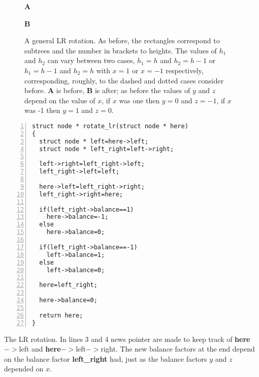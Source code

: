 \documentclass[11pt,a4paper]{scrartcl}
\begin{document}
\begin{figure}
{\bf A}
\begin{center}
\end{center}
{\bf B}
\begin{center}
\end{center}
\caption{A general LR rotation. As before, the rectangles correspond
  to subtrees and the number in brackets to heights. The values of
  $h_1$ and $h_2$ can vary between two cases, $h_1=h$ and $h_2=h-1$ or
  $h_1=h-1$ and $h_2=h$ with $x=1$ or $x=-1$ respectively,
  corresponding, roughly, to the dashed and dotted cases consider
  before. {\bf A} is before, {\bf B} is after; as before the values of
  $y$ and $z$ depend on the value of $x$, if $x$ was one then $y=0$
  and $z=-1$, if $x$ was -1 then $y=1$ and $z=0$.
\label{fig_LR_complicated}}
\end{figure}




\begin{table}
\begin{lstlisting}[numbers=left]
struct node * rotate_lr(struct node * here)
{
  struct node * left=here->left;
  struct node * left_right=left->right;

  left->right=left_right->left;
  left_right->left=left;

  here->left=left_right->right;
  left_right->right=here;
		  
  if(left_right->balance==1)
    here->balance=-1;
  else
    here->balance=0;
  
  if(left_right->balance==-1)
    left->balance=1;
  else
    left->balance=0;
		  
  here=left_right;
  
  here->balance=0;
  
  return here;
}
\end{lstlisting}
\caption{The LR rotation. In lines 3 and 4 news pointer are made to
  keep track of {\bf here}$->$left and {\bf
    here}$->$left$->$right. The new balance factors at the end depend
  on the balance factor {\bf left\_right} had, just as the balance
  factors $y$ and $z$ depended on $x$.\label{c_LR}}
\end{table}
\end{document}
